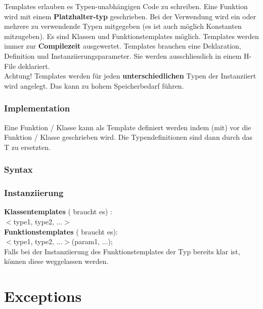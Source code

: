 Templates erlauben es Typen-unabhängigen Code zu schreiben. 
Eine Funktion wird mit einem \textbf{Platzhalter-typ} geschrieben. 
Bei der Verwendung wird ein oder mehrere zu verwendende Typen mitgegeben (es ist auch möglich Konstanten mitzugeben). 
Es sind Klassen und Funktionstemplates möglich. 
Templates werden immer zur \textbf{Compilezeit} ausgewertet. 
Templates brauchen eine Deklaration, Definition und Instanziierungsparameter. 
Sie werden ausschliesslich in einem H-File deklariert.\\
Achtung! Templates werden für jeden \textbf{unterschiedlichen} Typen der Instanziiert wird angelegt. 
Das kann zu hohem Speicherbedarf führen.

\subsubsection{Implementation}

Eine Funktion / Klasse kann als Template definiert werden indem  (mit\say{$<>$}) vor die Funktion / Klasse geschrieben wird. 
Die Typendefinitionen sind dann durch das T zu ersetzten. 



\subsubsection{Syntax}



\subsubsection{Instanziierung}

\textbf{Klassentemplates} (\say{$<>$} braucht es) :\\
$<$type1, type2, ...$>$ \\

\textbf{Funktionstemplates} (\say{$<>$} braucht es):\\
$<$type1, type2, ...$>$(param1, ...);\\

Falls bei der Instanziierung des Funktionstemplates der Typ bereits klar ist, können diese weggelassen werden. 

\nextcol

\section{Exceptions}

